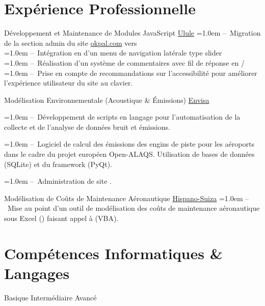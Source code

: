 \documentclass[10pt, a4paper]{article}
\begin{document}
\section{Expérience Professionnelle}
\begin{experiences}
	{Développement et Maintenance de Modules JavaScript}
	{\hfill}
	{\href{http://www.ulule.com}{Ulule}}
	{\hangindent=1.0em --~Migration de la section admin du site \href{http://www.okpal.com}{okpal.com} vers \redux\\
	\hangindent=1.0em --~Intégration en \react d'un menu de navigation latérale type slider\\
	\hangindent=1.0em --~Réalisation d'un système de commentaires avec fil de réponse en \react / \redux\\
	\hangindent=1.0em --~Prise en compte de recommandations \wcag sur l'accessibilité pour améliorer l'expérience utilisateur du site au clavier.}
	
	{Modélisation Environnementale (Acoustique \& \'Emissions)}
	{\hfill}
	{\href{http://www.env-isa.com}{Envisa}}
	{\hangindent=1.0em --~Développement de scripts en langage \python pour l'automatisation de la collecte et de l'analyse de données bruit et émissions.

	\hangindent=1.0em --~Logiciel \python de calcul des émissions des engins de piste pour les aéroports dans le cadre du projet européen Open-ALAQS. Utilisation de bases de données \sql (SQLite) et du framework \qt (PyQt).
	
	\hangindent=1.0em --~Administration de site \wordpress.}
	{Modélisation de Coûts de Maintenance Aéronautique}
	{\hfill}
	{\href{http://www.safran-transmission-systems.com}{Hispano-Suiza}}
	{\hangindent=1.0em --~Mise au point d'un outil de modélisation des coûts de maintenance aéronautique sous Excel (\office) faisant appel à \visb (VBA).}
\end{experiences}
\vspace{-1em}
\section{Compétences Informatiques \& Langages}
\vspace{-0.5em}
\begin{skillslisting}
	\skills{\threeskill}{\python}
	\skills{\threeskill}{\bootstrap}
	\skills{\threeskill}{\html}
	\skills{\threeskill}{\sass}
	\skills{\threeskill}{\js}
	\skills{\threeskill}{\jquery}
	\skills{\threeskill}{\react}
	\skills{\twoskill}{\angular}
	\skills{\twoskill}{\nodejs}
	\skills{\threeskill}{\sql}
	\skills{\threeskill}{\git}
	\skills{\twoskill}{\patterns}
	\skills{\oneskill}{\visb}
	\skills{\twoskill}{\LaTeX}
\end{skillslisting}
\vspace{-1em}
\begin{footnotesize}
	\oneskill Basique \hfill
	\twoskill Intermédiaire \hfill
	\threeskill Avancé
\end{footnotesize}
\end{document}
